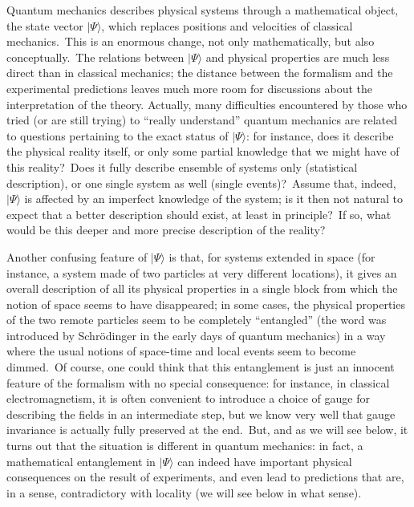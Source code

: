 \documentclass[12pt,onecolumn]{article}%
\begin{document}
\newpage
\tableofcontents
\newpage

Quantum mechanics describes physical systems through a mathematical object,
the state vector $|\Psi\rangle $, which replaces positions and velocities of
classical mechanics.\ This is an enormous change, not only mathematically, but
also conceptually.\ The relations between $|\Psi\rangle $ and physical properties
are much less direct than in classical mechanics; the distance between the
formalism and the experimental predictions leaves much more room for
discussions about the interpretation of the theory. Actually, many
difficulties encountered by those who tried (or are still trying) to ``really
understand'' quantum mechanics are related to questions pertaining to the
exact status of $|\Psi\rangle $: for instance, does it describe the physical
reality itself, or only some partial knowledge that we might have of this
reality?\ Does it fully describe ensemble of systems only (statistical
description), or one single system as well (single events)?\ Assume that,
indeed, $|\Psi\rangle $ is affected by an imperfect knowledge of the system; is it
then not natural to expect that a better description should exist, at least in
principle?\ If so, what would be this deeper and more precise description of
the reality?

Another confusing feature of $|\Psi\rangle $ is that, for systems extended in
space (for instance, a system made of two particles at very different
locations), it gives an overall description of all its physical properties in
a single block from which the notion of space seems to have disappeared; in
some cases, the physical properties of the two remote particles seem to be
completely ``entangled'' (the word was introduced by Schr\"{o}dinger in the
early days of quantum mechanics) in a way where the usual notions of
space-time and local events seem to become dimmed.\ Of course, one could think
that this entanglement is just an innocent feature of the formalism with no
special consequence: for instance, in classical electromagnetism, it is often
convenient to introduce a choice of gauge for describing the fields in an
intermediate step, but we know very well that gauge invariance is actually
fully preserved at the end.\ But, and as we will see below, it turns out that
the situation is different in quantum mechanics: in fact, a mathematical
entanglement in $|\Psi\rangle $ can indeed have important physical consequences on
the result of experiments, and even lead to predictions that are, in a sense,
contradictory with locality (we will see below in what sense).
\end{document}
